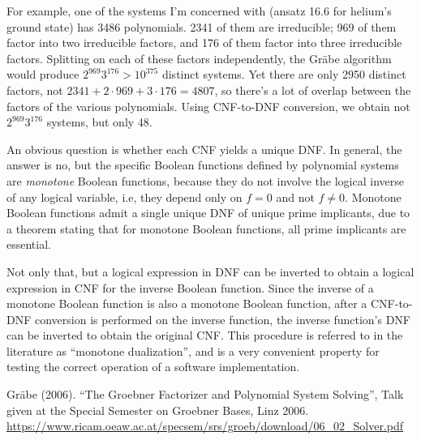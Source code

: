 \documentclass{article}
\begin{document}
For example, one of the systems I'm concerned with (ansatz 16.6 for helium's ground state)
has 3486 polynomials.  2341 of them are irreducible; 969 of them factor into two irreducible factors, and 176 of them
factor into three irreducible factors.  Splitting on each of these factors independently,
the Gr\"abe algorithm would produce $2^{969} 3^{176} > 10^{375}$
distinct systems.  Yet there are only 2950 distinct factors, not $2341+2\cdot969+3\cdot176=4807$,
so there's a lot of overlap between the factors of the various polynomials.
Using CNF-to-DNF conversion, we obtain not $2^{969} 3^{176}$ systems, but only 48.

An obvious question is whether each CNF yields a unique DNF.  In general, the
answer is no, but the specific Boolean functions defined by polynomial systems are {\it monotone} Boolean functions,
because they do not involve the logical inverse of any logical variable, i.e,
they depend only on $f=0$ and not $f\ne 0$.  Monotone Boolean functions admit
a single unique DNF of unique prime implicants, due to a theorem stating that for monotone Boolean functions,
all prime implicants are essential.

Not only that, but a logical expression in DNF can be inverted to obtain a logical expression in CNF
for the inverse Boolean function.  Since the inverse of a monotone Boolean function is also
a monotone Boolean function, after a CNF-to-DNF conversion is performed on the inverse function,
the inverse function's DNF can be inverted to obtain the original CNF.  This procedure
is referred to in the literature as ``monotone dualization'', and is a very convenient
property for testing the correct operation of a software implementation.


\begin{thebibliography}{9}
Gr\"abe (2006).  ``The Groebner Factorizer and Polynomial System Solving'',
Talk given at the Special Semester on Groebner Bases, Linz 2006.
\url{https://www.ricam.oeaw.ac.at/specsem/srs/groeb/download/06_02_Solver.pdf}
\end{thebibliography}
\end{document}
